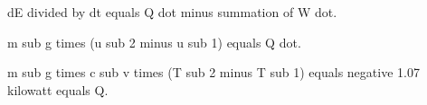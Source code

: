 dE divided by dt equals Q dot minus summation of W dot.  

m sub g times (u sub 2 minus u sub 1) equals Q dot.  

m sub g times c sub v times (T sub 2 minus T sub 1) equals negative 1.07 kilowatt equals Q.